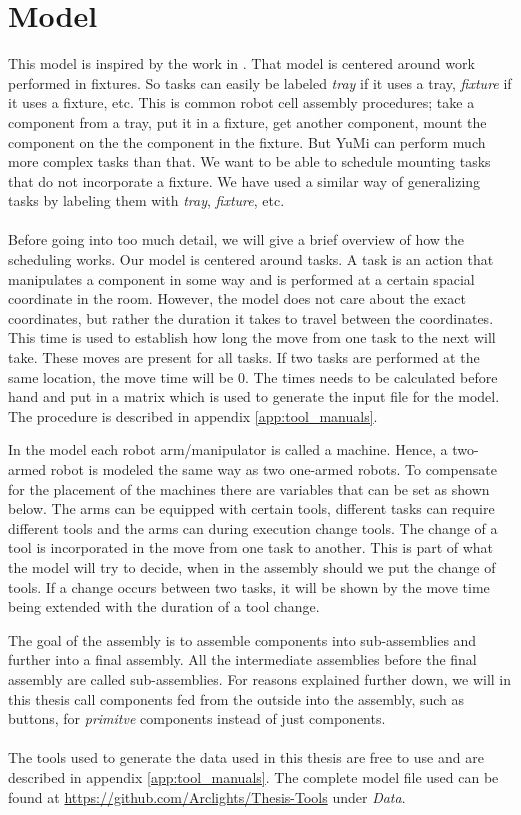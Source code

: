 \chapter{Model}\label{cha:model}

 This model is inspired by the work in \cite{ejenstam_2014}. That model is centered around work performed in fixtures. So tasks can easily be labeled \emph{tray} if it uses a tray, \emph{fixture} if it uses a fixture, etc. This is common robot cell assembly procedures; take a component from a tray, put it in a fixture, get another component, mount the component on the the component in the fixture. But YuMi can perform much more complex tasks than that. We want to be able to schedule mounting tasks that do not incorporate a fixture. We have used a similar way of generalizing tasks by labeling them with \emph{tray}, \emph{fixture}, etc.
 \\\\
Before going into too much detail, we will give a brief overview of how the scheduling works. Our model is centered around tasks. A task is an action that manipulates a component in some way and is performed at a certain spacial coordinate in the room. However, the model does not care about the exact coordinates, but rather the duration it takes to travel between the coordinates. This time is used to establish how long the move from one task to the next will take. These moves are present for all tasks. If two tasks are performed at the same location, the move time will be $0$. The times needs to be calculated before hand and put in a matrix which is used to generate the input file for the model. The procedure is described in appendix \ref{app:tool_manuals}.

In the model each robot arm/manipulator is called a machine. Hence, a two-armed robot is modeled the same way as two one-armed robots. To compensate for the placement of the machines there are variables that can be set as shown below. The arms can be equipped with certain tools, different tasks can require different tools and the arms can during execution change tools. The change of a tool is incorporated in the move from one task to another. This is part of what the model will try to decide, when in the assembly should we put the change of tools. If a change occurs between two tasks, it will be shown by the move time being extended with the duration of a tool change.

 The goal of the assembly is to assemble components into sub-assemblies and further into a final assembly. All the intermediate assemblies before the final assembly are called sub-assemblies. For reasons explained further down, we will in this thesis call components fed from the outside into the assembly, such as buttons, for \emph{primitve} components instead of just components.
\\\\
The tools used to generate the data used in this thesis are free to use and are described in appendix \ref{app:tool_manuals}. The complete model file used can be found at \url{https://github.com/Arclights/Thesis-Tools} under \emph{Data}.
 
